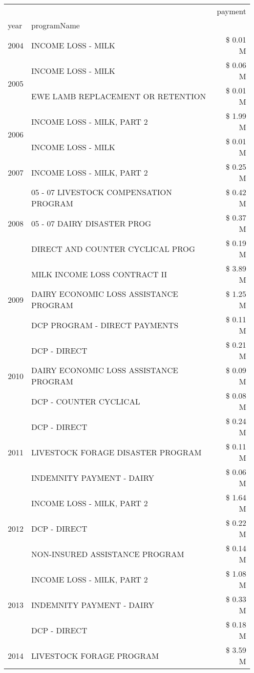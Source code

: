\begin{tabular}{llr}
\toprule
 &  & payment \\
year & programName &  \\
\midrule
2004 & INCOME LOSS - MILK & \$ 0.01 M \\
\cline{1-3}
\multirow[t]{2}{*}{2005} & INCOME LOSS - MILK & \$ 0.06 M \\
 & EWE LAMB REPLACEMENT OR RETENTION & \$ 0.01 M \\
\cline{1-3}
\multirow[t]{2}{*}{2006} & INCOME LOSS - MILK, PART 2 & \$ 1.99 M \\
 & INCOME LOSS - MILK & \$ 0.01 M \\
\cline{1-3}
2007 & INCOME LOSS - MILK, PART 2 & \$ 0.25 M \\
\cline{1-3}
\multirow[t]{3}{*}{2008} & 05 - 07 LIVESTOCK COMPENSATION PROGRAM & \$ 0.42 M \\
 & 05 - 07 DAIRY DISASTER PROG & \$ 0.37 M \\
 & DIRECT AND COUNTER CYCLICAL PROG & \$ 0.19 M \\
\cline{1-3}
\multirow[t]{3}{*}{2009} & MILK INCOME LOSS CONTRACT II & \$ 3.89 M \\
 & DAIRY ECONOMIC LOSS ASSISTANCE PROGRAM & \$ 1.25 M \\
 & DCP PROGRAM - DIRECT PAYMENTS & \$ 0.11 M \\
\cline{1-3}
\multirow[t]{3}{*}{2010} & DCP - DIRECT & \$ 0.21 M \\
 & DAIRY ECONOMIC LOSS ASSISTANCE PROGRAM & \$ 0.09 M \\
 & DCP - COUNTER CYCLICAL & \$ 0.08 M \\
\cline{1-3}
\multirow[t]{3}{*}{2011} & DCP - DIRECT & \$ 0.24 M \\
 & LIVESTOCK FORAGE DISASTER PROGRAM & \$ 0.11 M \\
 & INDEMNITY PAYMENT - DAIRY & \$ 0.06 M \\
\cline{1-3}
\multirow[t]{3}{*}{2012} & INCOME LOSS - MILK, PART 2 & \$ 1.64 M \\
 & DCP - DIRECT & \$ 0.22 M \\
 & NON-INSURED ASSISTANCE PROGRAM & \$ 0.14 M \\
\cline{1-3}
\multirow[t]{3}{*}{2013} & INCOME LOSS - MILK, PART 2 & \$ 1.08 M \\
 & INDEMNITY PAYMENT - DAIRY & \$ 0.33 M \\
 & DCP - DIRECT & \$ 0.18 M \\
\cline{1-3}
\multirow[t]{3}{*}{2014} & LIVESTOCK FORAGE PROGRAM & \$ 3.59 M \\

\end{tabular}
